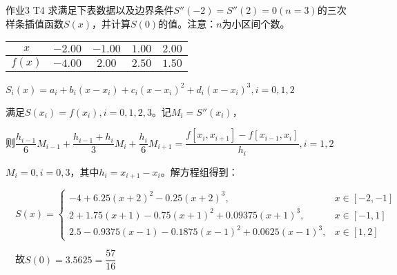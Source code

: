 \documentclass{beamer}
\begin{document}
    \begin{frame}{作业3 T4}
        求满足下表数据以及边界条件$S''(-2)=S''(2)=0(n=3)$的三次样条插值函数$S(x)$，并计算$S(0)$的值。注意：$n$为小区间个数。
        \begin{table}[H]
            \begin{center}
                \begin{tabular}{|c|c|c|c|c|}
                \hline
                $x$ & $-2.00$ & $-1.00$ & $1.00$ & $2.00$ \\
                \hline
                $f(x)$ & $-4.00$ & $2.00$ & $2.50$ & $1.50$ \\
                \hline
                \end{tabular}
            \end{center}
        \end{table}

        \pause $S_i(x)=a_i+b_i(x-x_i)+c_i(x-x_i)^2+d_i(x-x_i)^3,i=0,1,2$

        \pause 满足$S(x_i)=f(x_i),i=0,1,2,3$。记$M_i=S''(x_i)$，

        \pause 则$\dfrac{h_{i-1}}{6}M_{i-1}+\dfrac{h_{i-1}+h_i}{3}M_i+\dfrac{h_i}{6}M_{i+1}=\dfrac{f[x_i,x_{i+1}]-f[x_{i-1},x_i]}{h_i},i=1,2$

        \pause $M_i=0,i=0,3$，其中$h_i=x_{i+1}-x_i$。解方程组得到：

        \pause $\quad S(x)=\begin{cases}-4+6.25(x+2)^2-0.25(x+2)^3,&x\in[-2,-1]\\2+1.75(x+1)-0.75(x+1)^2+0.09375(x+1)^3,&x\in[-1,1]\\2.5-0.9375(x-1)-0.1875(x-1)^2+0.0625(x-1)^3,&x\in[1,2]\end{cases}$

        \pause $\quad$故$S(0)=3.5625=\dfrac{57}{16}$
    \end{frame}
\end{document}
